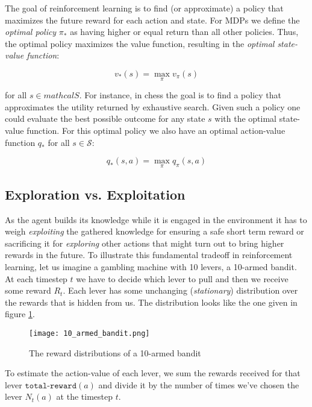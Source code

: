 The goal of reinforcement learning is to find (or approximate) a policy that maximizes the future reward for each action and state. For MDPs we define the \textit{optimal policy} $\pi_*$ as having higher or equal return than all other policies. Thus, the optimal policy maximizes the value function, resulting in the \textit{optimal state-value function}:

\begin{equation}
    v_{*}(s) = \max_{\pi} v_{\pi}(s)
\end{equation}

for all $s \in mathcal{S}$. For instance, in chess the goal is to find a policy that approximates the utility returned by exhaustive search. Given such a policy one could evaluate the best possible outcome for any state $s$ with the optimal state-value function. For this optimal policy we also have an optimal action-value function $ q_{*} $ for all $ s \in \mathcal{S}$:

\begin{equation}
    q_{*}(s, a) = \max_{\pi}q_{\pi}(s, a)
\end{equation}

\subsection{Exploration vs. Exploitation}
\label{exploration_vs_exploitation}
As the agent builds its knowledge while it is engaged in the environment it has to weigh \textit{exploiting} the gathered knowledge for ensuring a safe short term reward or sacrificing it for \textit{exploring} other actions that might turn out to bring higher rewards in the future. To illustrate this fundamental tradeoff in reinforcement learning, let us imagine a gambling machine with 10 levers, a 10-armed bandit. At each timestep $ t $ we have to decide which lever to pull and then we receive some reward $ R_t $. Each lever has some unchanging (\textit{stationary}) distribution over the rewards that is hidden from us. The distribution looks like the one given in figure \ref{10_armed_bandit}.

\begin{figure}
    \centering
    \texttt{[image: 10\_armed\_bandit.png]}
    \caption{The reward distributions of a 10-armed bandit \cite[p.28]{sutton_reinforcement_2018}}
    \label{10_armed_bandit}
\end{figure}

To estimate the action-value of each lever, we sum the rewards received for that lever $ \texttt{total-reward}(a) $ and divide it by the number of times we've chosen the lever $ N_t(a) $ at the timestep $ t $.

